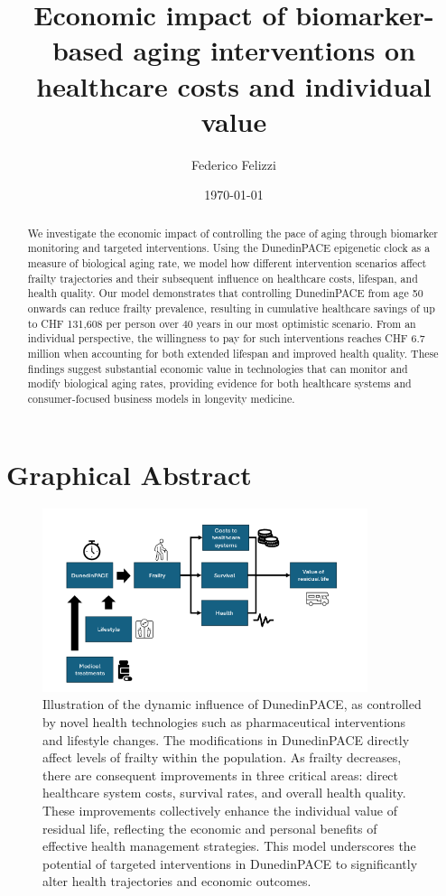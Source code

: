 \documentclass[12pt,a4paper]{article}
\title{Economic impact of biomarker-based aging interventions on healthcare costs and individual value}
\author{Federico Felizzi}
\date{\today}
\begin{document}
\maketitle

\begin{abstract}
We investigate the economic impact of controlling the pace of aging through biomarker monitoring and targeted interventions. Using the DunedinPACE epigenetic clock as a measure of biological aging rate, we model how different intervention scenarios affect frailty trajectories and their subsequent influence on healthcare costs, lifespan, and health quality. Our model demonstrates that controlling DunedinPACE from age 50 onwards can reduce frailty prevalence, resulting in cumulative healthcare savings of up to CHF 131,608 per person over 40 years in our most optimistic scenario. From an individual perspective, the willingness to pay for such interventions reaches CHF 6.7 million when accounting for both extended lifespan and improved health quality. These findings suggest substantial economic value in technologies that can monitor and modify biological aging rates, providing evidence for both healthcare systems and consumer-focused business models in longevity medicine.
\end{abstract}

\section{Graphical Abstract}

\begin{figure}[h]
\centering
\includegraphics[width=0.85\textwidth]{figures/Figure1.png}
\caption{Illustration of the dynamic influence of DunedinPACE, as controlled by novel health technologies such as pharmaceutical interventions and lifestyle changes. The modifications in DunedinPACE directly affect levels of frailty within the population. As frailty decreases, there are consequent improvements in three critical areas: direct healthcare system costs, survival rates, and overall health quality. These improvements collectively enhance the individual value of residual life, reflecting the economic and personal benefits of effective health management strategies. This model underscores the potential of targeted interventions in DunedinPACE to significantly alter health trajectories and economic outcomes.}
\label{fig:graphical_abstract}
\end{figure}
\newpage
\end{document}
